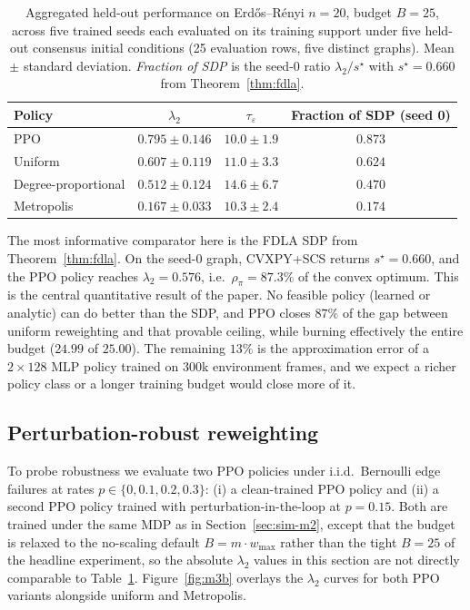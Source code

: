 \documentclass[letterpaper, 11 pt, journal, twoside]{IEEEtran}
\begin{document}
\begin{table}[t]
\centering
\caption{Aggregated held-out performance on Erd\H{o}s--R\'enyi
$n{=}20$, budget $B{=}25$, across five trained seeds each evaluated
on its training support under five held-out consensus initial
conditions (25 evaluation rows, five distinct graphs). Mean $\pm$
standard deviation. \emph{Fraction of SDP} is the seed-0 ratio
$\lambda_2/s^\star$ with $s^\star = 0.660$ from Theorem~\ref{thm:fdla}.}
\label{tab:m2}
\begin{tabular}{lccc}
\toprule
Policy & $\lambda_2$ & $\tau_\varepsilon$ & Fraction of SDP (seed 0) \\
\midrule
PPO                  & $0.795 \pm 0.146$ & $10.0 \pm 1.9$  & $0.873$ \\
Uniform              & $0.607 \pm 0.119$ & $11.0 \pm 3.3$  & $0.624$ \\
Degree-proportional  & $0.512 \pm 0.124$ & $14.6 \pm 6.7$  & $0.470$ \\
Metropolis           & $0.167 \pm 0.033$ & $10.3 \pm 2.4$  & $0.174$ \\
\bottomrule
\end{tabular}
\end{table}

The most informative comparator here is the FDLA SDP from
Theorem~\ref{thm:fdla}. On the seed-0 graph, CVXPY+SCS returns
$s^\star = 0.660$, and the PPO policy reaches $\lambda_2 = 0.576$,
i.e.\ $\rho_\pi = 87.3\%$ of the convex optimum. This is the
central quantitative result of the paper. No feasible policy
(learned or analytic) can do better than the SDP, and PPO closes
$87\%$ of the gap between uniform reweighting and that provable
ceiling, while burning effectively the entire budget ($24.99$ of
$25.00$). The remaining $13\%$ is the approximation error of a
$2 \times 128$ MLP policy trained on $300$k environment frames, and
we expect a richer policy class or a longer training budget would
close more of it.

\subsection{Perturbation-robust reweighting}
\label{sec:sim-m3b}
To probe robustness we evaluate two PPO policies under i.i.d.\
Bernoulli edge failures at rates $p \in \{0, 0.1, 0.2, 0.3\}$:
(i) a clean-trained PPO policy and (ii) a second PPO policy trained
with perturbation-in-the-loop at $p = 0.15$. Both are trained under
the same MDP as in Section~\ref{sec:sim-m2}, except that the budget
is relaxed to the no-scaling default $B = m \cdot w_{\max}$ rather
than the tight $B = 25$ of the headline experiment, so the absolute
$\lambda_2$ values in this section are not directly comparable to
Table~\ref{tab:m2}. Figure~\ref{fig:m3b} overlays the $\lambda_2$
curves for both PPO variants alongside uniform and Metropolis.
\end{document}
